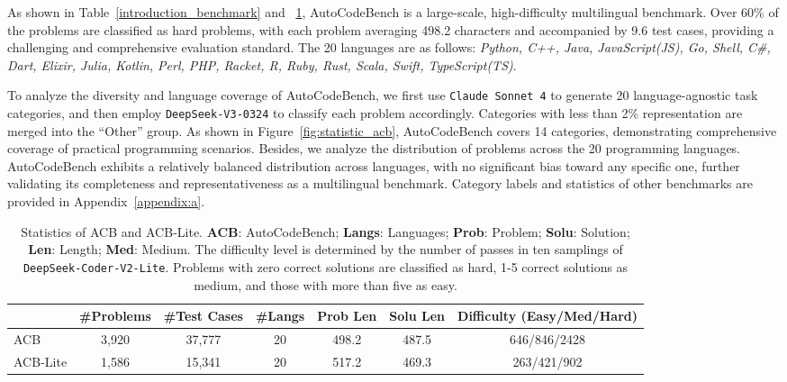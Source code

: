 As shown in Table~\ref{introduction_benchmark} and ~\ref{method_bench}, AutoCodeBench is a large-scale, high-difficulty multilingual benchmark. Over 60\% of the problems are classified as hard problems, with each problem averaging 498.2 characters and accompanied by 9.6 test cases, providing a challenging and comprehensive evaluation standard. The 20 languages are as follows: \textit{Python, C++, Java, JavaScript(JS), Go, Shell, C\#, Dart, Elixir, Julia, Kotlin, Perl, PHP, Racket, R, Ruby, Rust, Scala, Swift, TypeScript(TS)}. 





To analyze the diversity and language coverage of AutoCodeBench, we first use \texttt{Claude Sonnet 4} to generate 20 language-agnostic task categories, and then employ \texttt{DeepSeek-V3-0324} to classify each problem accordingly. Categories with less than 2\% representation are merged into the ``Other'' group. As shown in Figure~\ref{fig:statistic_acb}, AutoCodeBench covers 14 categories, demonstrating comprehensive coverage of practical programming scenarios. Besides, we analyze the distribution of problems across the 20 programming languages. AutoCodeBench exhibits a relatively balanced distribution across languages, with no significant bias toward any specific one, further validating its completeness and representativeness as a multilingual benchmark. Category labels and statistics of other benchmarks are provided in Appendix~\ref{appendix:a}.



\begin{table}[]
\begin{tabular}{lcccccc}
\toprule
                   & \#Problems & \#Test Cases & \#Langs & Prob Len  & Solu Len & Difficulty (Easy/Med/Hard) \\
\midrule
ACB      & 3,920      & 37,777       & 20          & 498.2                & 487.5                 & 646/846/2428                    \\
ACB-Lite &   1,586         &  15,341            &    20         &                     517.2         &                          469.3     & 263/421/902  \\
\bottomrule
\end{tabular}
\caption{Statistics of ACB and ACB-Lite. \textbf{ACB}: AutoCodeBench; \textbf{Langs}: Languages; \textbf{Prob}: Problem; \textbf{Solu}: Solution; \textbf{Len}: Length; \textbf{Med}: Medium. The difficulty level is determined by the number of passes in ten samplings of \texttt{DeepSeek-Coder-V2-Lite}. Problems with zero correct solutions are classified as hard, 1-5 correct solutions as medium, and those with more than five as easy.}
\label{method_bench}
\end{table}






